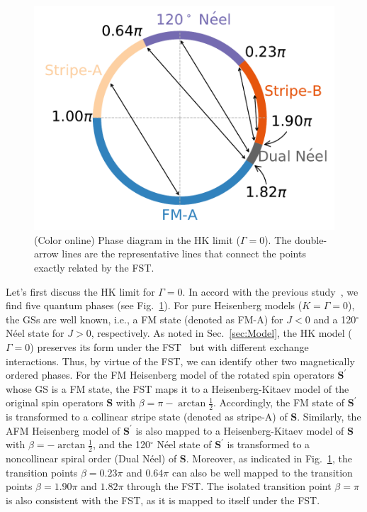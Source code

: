 \documentclass[aps,prb,reprint,amsfonts,amsmath,amssymb,showpacs,groupedaddress,superscriptaddress]{revtex4-1}
\begin{document}
\begin{figure}
    \centering
    \includegraphics[width=\columnwidth]{fig/HKModel.pdf}
    \caption{\label{fig:HKModel}(Color online) Phase diagram in the HK limit ($\Gamma=0$). The double-arrow lines are the representative lines that connect the points exactly related by the FST.}
\end{figure}
Let's first discuss the HK limit for $\Gamma=0$. In accord with the previous study~\cite{KaiLi2015}, we find five quantum phases (see Fig.~\ref{fig:HKModel}). For pure Heisenberg models ($K=\Gamma=0$), the GSs are well known, i.e., a FM state (denoted as FM-A) for $J<0$ and a 120$^\circ$ N\'{e}el state for $J>0$, respectively. As noted in Sec.~\ref{sec:Model}, the HK model ($\Gamma=0$) preserves its form under the FST~\cite{PhysRevB.89.014414} but with different exchange interactions. Thus, by virtue of the FST, we can identify other two magnetically ordered phases. For the FM Heisenberg model of the rotated spin operators $\bm{S}^{\prime}$ whose GS is a FM state, the FST maps it to a Heisenberg-Kitaev model of the original spin operators $\bm{S}$ with $\beta=\pi - \arctan\frac{1}{2}$. Accordingly, the FM state of $\bm{S}^{\prime}$ is transformed to a collinear stripe state (denoted as stripe-A) of $\bm{S}$. Similarly, the AFM Heisenberg model of $\bm{S}^{\prime}$ is also mapped to a Heisenberg-Kitaev model of $\bm{S}$ with $\beta=-\arctan\frac{1}{2}$, and the 120$^\circ$ N\'{e}el state of $\bm{S}^{\prime}$ is transformed to a noncollinear spiral order (Dual N\'{e}el) of $\bm{S}$. Moreover, as indicated in Fig.~\ref{fig:HKModel}, the transition points $\beta=0.23\pi$ and $0.64\pi$ can also be well mapped to the transition points $\beta=1.90\pi$ and $1.82\pi$ through the FST. The isolated transition point $\beta=\pi$ is also consistent with the FST, as it is mapped to itself under the FST.
\end{document}
